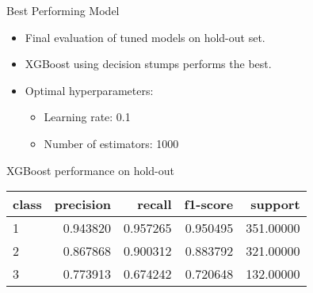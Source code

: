 \documentclass{beamer}
\begin{document}
\begin{frame}{Best Performing Model}
		\begin{itemize}
			\item Final evaluation of tuned models on hold-out set.
			\item XGBoost using decision stumps performs the best.
			\item Optimal hyperparameters:
			\begin{itemize}
				\item Learning rate: 0.1
				\item Number of estimators: 1000
			\end{itemize}
		\end{itemize}
	
	\begin{block}{XGBoost performance on hold-out}
		\centering
		\begin{tabular}{|l|r|r|r|r|}
			\hline 
			class &  precision &    recall &  f1-score &    support \\ \hline
			
			1            &   0.943820 &  0.957265 &  0.950495 &  351.00000 \\ \hline
			2            &   0.867868 &  0.900312 &  0.883792 &  321.00000 \\ \hline
			3            &   0.773913 &  0.674242 &  0.720648 &  132.00000 \\ \hline
 
			
		\end{tabular}
	\end{block}

\end{frame}
\end{document}
